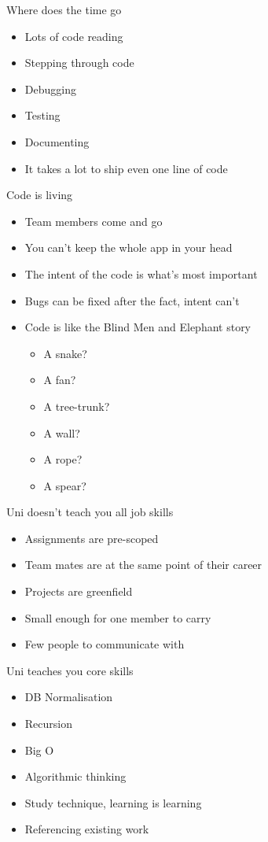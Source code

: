 \documentclass{beamer}
\begin{document}
\begin{frame}{Where does the time go}
\begin{itemize}
\item Lots of code reading
\item Stepping through code
\item Debugging
\item Testing
\item Documenting
\item It takes a lot to ship even one line of code
\end{itemize}
\end{frame}

\begin{frame}{Code is living}
\begin{itemize}
\item Team members come and go
\item You can't keep the whole app in your head
\item The intent of the code is what's most important
\item Bugs can be fixed after the fact, intent can't
\item Code is like the Blind Men and Elephant story
	\begin{itemize}
	\item A snake?
	\item A fan?
	\item A tree-trunk?
	\item A wall?
	\item A rope?
	\item A spear?
	\end{itemize}
\end{itemize}
\end{frame}

\begin{frame}{Uni doesn't teach you all job skills}
\begin{itemize}
\item Assignments are pre-scoped
\item Team mates are at the same point of their career
\item Projects are greenfield
\item Small enough for one member to carry
\item Few people to communicate with
\end{itemize}
\end{frame}

\begin{frame}{Uni teaches you core skills}
\begin{itemize}
\item DB Normalisation
\item Recursion
\item Big O
\item Algorithmic thinking
\item Study technique, learning is learning
\item Referencing existing work
\end{itemize}
\end{frame}
\end{document}
